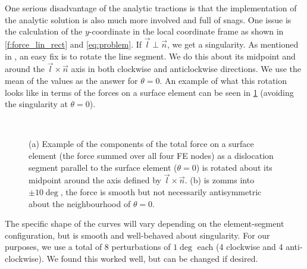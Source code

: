 One serious disadvantage of the analytic tractions is that the implementation of the analytic solution is also much more involved and full of snags. One issue is the calculation of the $y$-coordinate in the local coordinate frame as shown in \cref{f:force_lin_rect} and \cref{eq:problem}. If $\vec{l} \perp \vec{n}$, we get a singularity. As mentioned in \cite{analytic_tractions}, an easy fix is to rotate the line segment. We do this about its midpoint and around the $\vec{l} \times \vec{n}$ axis in both clockwise and anticlockwise directions. We use the mean of the values as the answer for $\theta = 0$. An example of what this rotation looks like in terms of the forces on a surface element can be seen in \cref{f:rotate} (avoiding the singularity at $\theta = 0$).
\begin{figure}
    \centering
    ~
    \caption[Sample analytical forces on an element as a function of angle between surface and segment.]{(a) Example of the components of the total force on a surface element (the force summed over all four FE nodes) as a dislocation segment parallel to the surface element ($\theta = 0$) is rotated about its midpoint around the axis defined by $\vec{l}\times\vec{n}$. (b) is zomms into $\pm 10 \deg$, the force is smooth but not necessarily antisymmetric about the neighbourhood of $\theta=0$.}
    \label{f:rotate}
\end{figure}
The specific shape of the curves will vary depending on the element-segment configuration, but is smooth and well-behaved about singularity. For our purposes, we use a total of 8 perturbations of $1\deg$ each (4 clockwise and 4 anti-clockwise). We found this worked well, but can be changed if desired.

